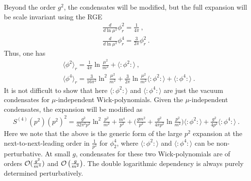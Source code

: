\documentclass[a4paper,11pt]{article}
\begin{document}
Beyond the order $g^2$, the condensates will be modified, but the full expansion will be scale invariant using the RGE
\begin{align}
\frac{d}{d\ln \mu^2}\phi_r^2=\frac{1}{4\pi} \ , \\ 
\frac{d}{d\ln \mu^2}\phi_r^4=\frac{3}{2\pi}\phi_r^2 \ .
\end{align}
Thus, one has
\begin{align}
&\langle \phi^2\rangle_r=\frac{1}{4\pi}\ln \frac{\mu^2}{m^2}+\langle:\phi^2:\rangle \ , \\ 
&\langle \phi^4\rangle_r=\frac{3}{16\pi^2}\ln^2 \frac{\mu^2}{m^2}+\frac{3}{2\pi}\ln \frac{\mu^2}{m^2}\langle:\phi^2:\rangle+\langle:\phi^4:\rangle \ .
\end{align}
It is not difficult to show that here $\langle:\phi^2:\rangle$ and $\langle:\phi^4:\rangle$ are just the vacuum condensates for $\mu$-independent Wick-polynomials.
Given the $\mu$-independent condensates, the expansion will be modified as
\begin{align}
S^{(4)}(p^2)(p^2)^2=\frac{g^2}{32\pi^2p^2}\ln^2 \frac{p^2}{m^2}+\frac{m^4}{p^2}+\bigg(\frac{gm^2}{p^2}+\frac{g^2}{4\pi p^2}\ln\frac{p^2}{m^2}\bigg)\langle:\phi^2:\rangle+\frac{g^2}{4p^2}\langle:\phi^4:\rangle\ .
\end{align}
Here we note that the above is the generic form of the large $p^2$ expansion at the next-to-next-leading order in $\frac{1}{p^2}$ for $\phi_2^4$, where $\langle:\phi^2:\rangle$ and $\langle :\phi^4:\rangle$ can be non-perturbative. At small $g$, condensates for these two Wick-polynomials are of orders ${\cal O}(\frac{g^2}{m^4})$ and ${\cal O}\left(\frac{g}{m^2}\right)$.  The double logarithmic dependency is always purely determined perturbatively. 
\end{document}
